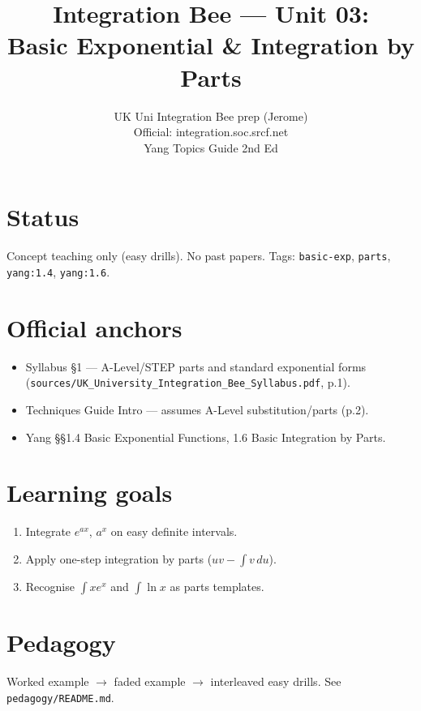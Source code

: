 
\title{Integration Bee --- Unit 03:\\ Basic Exponential \& Integration by Parts}
\author{UK Uni Integration Bee prep (Jerome)\\ Official: integration.soc.srcf.net\\ Yang Topics Guide 2nd Ed}
\date{}

\maketitle

\section*{Status}
Concept teaching only (easy drills). No past papers.
Tags: \texttt{basic-exp}, \texttt{parts}, \texttt{yang:1.4}, \texttt{yang:1.6}.

\section{Official anchors}
\begin{itemize}
  \item Syllabus §1 --- A-Level/STEP parts and standard exponential forms
        (\texttt{sources/UK\_University\_Integration\_Bee\_Syllabus.pdf}, p.1).
  \item Techniques Guide Intro --- assumes A-Level substitution/parts (p.2).
  \item Yang §§1.4 Basic Exponential Functions, 1.6 Basic Integration by Parts.
\end{itemize}

\section{Learning goals}
\begin{enumerate}
  \item Integrate $e^{ax}$, $a^x$ on easy definite intervals.
  \item Apply one-step integration by parts ($uv-\int v\,du$).
  \item Recognise $\int x e^x$ and $\int \ln x$ as parts templates.
\end{enumerate}

\section{Pedagogy}
Worked example $\to$ faded example $\to$ interleaved easy drills. See \texttt{pedagogy/README.md}.


